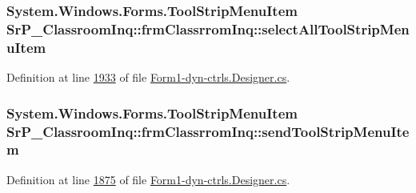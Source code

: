 \hypertarget{class_sr_p___classroom_inq_1_1frm_classrrom_inq_a7e6e1b306acf890605ad11f6aca7fce7}{
\subsubsection[{select\-All\-Tool\-Strip\-Menu\-Item}]{\setlength{\rightskip}{0pt plus 5cm}\-System.\-Windows.\-Forms.\-Tool\-Strip\-Menu\-Item {\bf \-Sr\-P\-\_\-\-Classroom\-Inq\-::frm\-Classrrom\-Inq\-::select\-All\-Tool\-Strip\-Menu\-Item}}}
\label{class_sr_p___classroom_inq_1_1frm_classrrom_inq_a7e6e1b306acf890605ad11f6aca7fce7}


\-Definition at line \hyperlink{_form1-dyn-ctrls_8_designer_8cs_source_l01933}{1933} of file \hyperlink{_form1-dyn-ctrls_8_designer_8cs_source}{\-Form1-\/dyn-\/ctrls.\-Designer.\-cs}.

\hypertarget{class_sr_p___classroom_inq_1_1frm_classrrom_inq_ab491a97cbd395fd4e69e4312fdc48eeb}{
\subsubsection[{send\-Tool\-Strip\-Menu\-Item}]{\setlength{\rightskip}{0pt plus 5cm}\-System.\-Windows.\-Forms.\-Tool\-Strip\-Menu\-Item {\bf \-Sr\-P\-\_\-\-Classroom\-Inq\-::frm\-Classrrom\-Inq\-::send\-Tool\-Strip\-Menu\-Item}}}
\label{class_sr_p___classroom_inq_1_1frm_classrrom_inq_ab491a97cbd395fd4e69e4312fdc48eeb}


\-Definition at line \hyperlink{_form1-dyn-ctrls_8_designer_8cs_source_l01875}{1875} of file \hyperlink{_form1-dyn-ctrls_8_designer_8cs_source}{\-Form1-\/dyn-\/ctrls.\-Designer.\-cs}.

